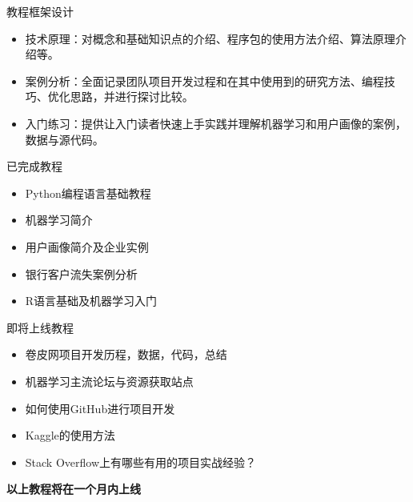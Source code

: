 \documentclass[10pt, aspectratio=32,handout]{beamer}
\begin{document}
\begin{frame}{教程框架设计}
\begin{itemize}
\item 技术原理：对概念和基础知识点的介绍、程序包的使用方法介绍、算法原理介绍等。\newline
\item 案例分析：全面记录团队项目开发过程和在其中使用到的研究方法、编程技巧、优化思路，并进行探讨比较。\newline
\item 入门练习：提供让入门读者快速上手实践并理解机器学习和用户画像的案例，数据与源代码。\newline
\end{itemize}
\end{frame}

\begin{frame}{已完成教程}
  \begin{itemize}
    \item Python编程语言基础教程\newline
    \item 机器学习简介\newline
    \item 用户画像简介及企业实例\newline
    \item 银行客户流失案例分析\newline
    \item R语言基础及机器学习入门\newline
  \end{itemize}
\end{frame}

\begin{frame}{即将上线教程}
  \begin{itemize}
    \item 卷皮网项目开发历程，数据，代码，总结\newline
    \item 机器学习主流论坛与资源获取站点\newline
    \item 如何使用GitHub进行项目开发\newline
    \item Kaggle的使用方法\newline
    \item Stack Overflow上有哪些有用的项目实战经验？\newline\newline
  \end{itemize}
  \textbf{以上教程将在一个月内上线}
\end{frame}
\end{document}
